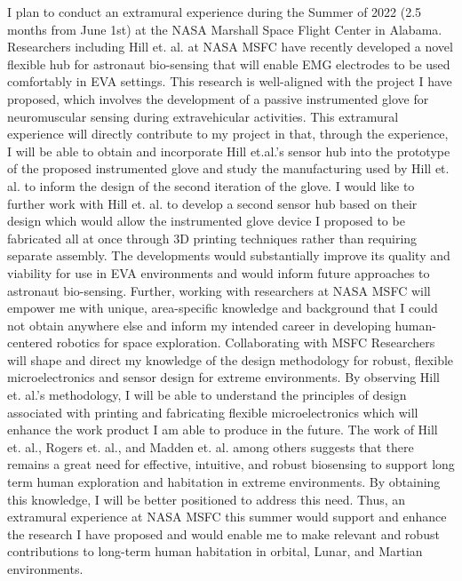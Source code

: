 \documentclass{article}
\begin{document}
\large{I plan to conduct an extramural experience during the Summer of 2022 (2.5 months from June 1st) at the NASA Marshall Space Flight Center in Alabama. 
Researchers including Hill et. al. at NASA MSFC have recently developed a novel flexible hub for astronaut bio-sensing that will enable EMG electrodes to be used comfortably in EVA settings. This research is well-aligned with the project I have proposed, which involves the development of a passive instrumented glove for neuromuscular sensing during extravehicular activities. This extramural experience will directly contribute to my project in that, through the experience, I will be able to obtain and incorporate Hill et.al.'s sensor hub into the prototype of the proposed instrumented glove and study the manufacturing used by Hill et. al. to inform the design of the second iteration of the glove. I would like to further work with Hill et. al. to develop a second sensor hub based on their design which would allow the instrumented glove device I proposed to be fabricated all at once through 3D printing techniques rather than requiring separate assembly. The developments would substantially improve its quality and viability for use in EVA environments and would inform future approaches to astronaut bio-sensing.
Further, working with researchers at NASA MSFC will empower me with unique, area-specific knowledge and background that I could not obtain anywhere else and inform my intended career in developing human-centered robotics for space exploration. Collaborating with MSFC Researchers will shape and direct my knowledge of the design methodology for robust, flexible microelectronics and sensor design for extreme environments. By observing Hill et. al.’s methodology, I will be able to understand the principles of design associated with printing and fabricating flexible microelectronics which will enhance the work product I am able to produce in the future. The work of Hill et. al., Rogers et. al., and Madden et. al. among others suggests that there remains a great need for effective, intuitive, and robust biosensing to support long term human exploration and habitation in extreme environments. By obtaining this knowledge, I will be better positioned to address this need.
Thus, an extramural experience at NASA MSFC this summer would support and enhance the research I have proposed and would enable me to make relevant and robust contributions to long-term human habitation in orbital, Lunar, and Martian environments.}

\clearpage
\end{document}
